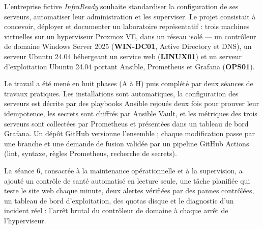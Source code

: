
L'entreprise fictive \emph{InfraReady} souhaite standardiser la configuration de ses serveurs,
automatiser leur administration et les superviser. Le projet consistait à concevoir, déployer et
documenter un laboratoire représentatif : trois machines virtuelles sur un hyperviseur Proxmox VE,
dans un réseau isolé  — un contrôleur de domaine Windows Server 2025
(\textbf{WIN-DC01}, Active Directory et DNS), un serveur Ubuntu 24.04 hébergeant un service web
(\textbf{LINUX01}) et un serveur d'exploitation Ubuntu 24.04 portant Ansible, Prometheus et
Grafana (\textbf{OPS01}).

Le travail a été mené en huit phases (A à H) puis complété par deux séances de travaux pratiques.
Les installations sont automatiques, la configuration des serveurs est décrite par des playbooks
Ansible rejoués deux fois pour prouver leur idempotence, les secrets sont chiffrés par Ansible
Vault, et les métriques des trois serveurs sont collectées par Prometheus et présentées dans un
tableau de bord Grafana. Un dépôt GitHub versionne l'ensemble ; chaque modification passe par une
branche et une demande de fusion validée par un pipeline GitHub Actions (lint, syntaxe, règles
Prometheus, recherche de secrets).

La séance 6, consacrée à la maintenance opérationnelle et à la supervision, a ajouté un contrôle de
santé automatisé en lecture seule, une tâche planifiée qui teste le site web chaque minute, deux
alertes vérifiées par des pannes contrôlées, un tableau de bord d'exploitation, des quotas disque et
le diagnostic d'un incident réel : l'arrêt brutal du contrôleur de domaine à chaque arrêt de
l'hyperviseur.


